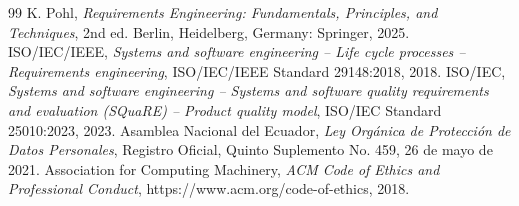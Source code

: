 \documentclass[11pt, a4paper]{article}
\begin{document}
\begin{thebibliography}{99}
 K. Pohl, \emph{Requirements Engineering: Fundamentals, Principles, and Techniques}, 2nd ed. Berlin, Heidelberg, Germany: Springer, 2025.
 ISO/IEC/IEEE, \emph{Systems and software engineering -- Life cycle processes -- Requirements engineering}, ISO/IEC/IEEE Standard 29148:2018, 2018.
 ISO/IEC, \emph{Systems and software engineering -- Systems and software quality requirements and evaluation (SQuaRE) -- Product quality model}, ISO/IEC Standard 25010:2023, 2023.
 Asamblea Nacional del Ecuador, \emph{Ley Org\'anica de Protecci\'on de Datos Personales}, Registro Oficial, Quinto Suplemento No. 459, 26 de mayo de 2021.
 Association for Computing Machinery, \emph{ACM Code of Ethics and Professional Conduct}, https://www.acm.org/code-of-ethics, 2018.
\end{thebibliography}
\end{document}
